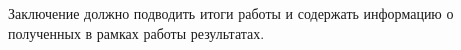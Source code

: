 
Заключение должно подводить итоги работы и содержать информацию о полученных в рамках работы результатах.
